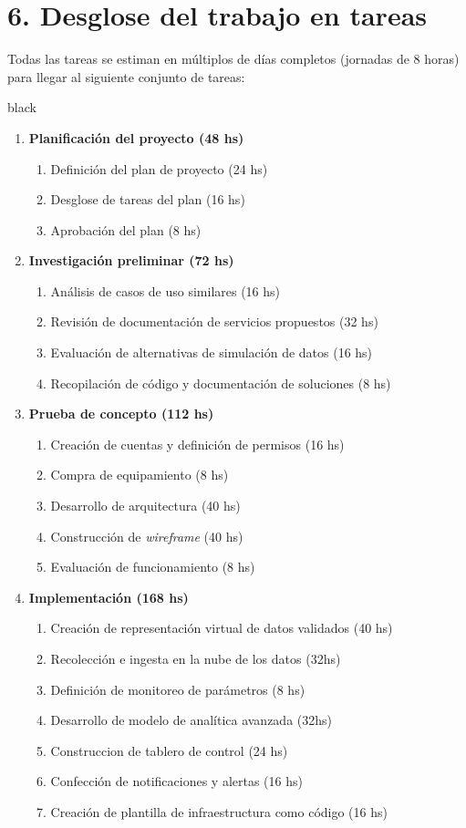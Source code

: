 \documentclass[11pt]{charter}
\begin{document}
\section{6. Desglose del trabajo en tareas}
\label{sec:wbs}
Todas las tareas se estiman en múltiplos de días completos (jornadas de 8 horas) para llegar al siguiente conjunto de tareas:
\begin{consigna}{black}
\begin{enumerate}

\item \textbf{Planificación del proyecto (48 hs)}
	\begin{enumerate}
	\item Definición del plan de proyecto (24 hs)
	\item Desglose de tareas del plan  (16 hs)
	\item Aprobación del plan (8 hs)
	\end{enumerate}

\item \textbf{Investigación preliminar (72 hs)}
	\begin{enumerate}
	\item Análisis de casos de uso similares (16 hs)
	\item Revisión de documentación de servicios propuestos (32 hs)
	\item Evaluación de alternativas de simulación de datos (16 hs)
	\item Recopilación de código y documentación de soluciones (8 hs)
	\end{enumerate}

\item \textbf{Prueba de concepto (112 hs)}
	\begin{enumerate}
	\item Creación de cuentas y definición de permisos (16 hs)
	\item Compra de equipamiento (8 hs)
	\item Desarrollo de arquitectura (40 hs)
	\item Construcción de \textit{wireframe} (40 hs)
	\item Evaluación de funcionamiento (8 hs)
	\end{enumerate}
	
\item \textbf{Implementación (168 hs)}
	\begin{enumerate}
	\item Creación de representación virtual de datos validados (40 hs)
	\item Recolección e ingesta en la nube de los datos (32hs)
	\item Definición de monitoreo de parámetros (8 hs)
	\item Desarrollo de modelo de analítica avanzada (32hs)
	\item Construccion de tablero de control (24 hs)
	\item Confección de notificaciones y alertas (16 hs)
	\item Creación de plantilla de infraestructura como código (16 hs)
	\end{enumerate}


\end{enumerate}
\end{consigna}
\end{document}

